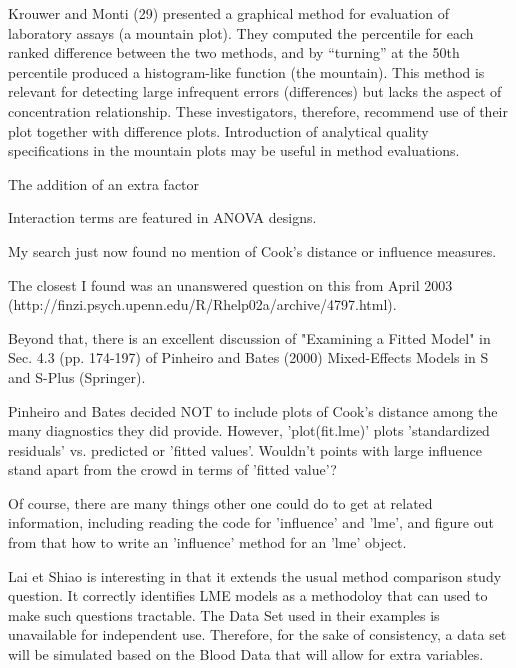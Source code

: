 \documentclass[12pt, a4paper]{report}
\begin{document}


Krouwer and Monti (29) presented a graphical method for evaluation of laboratory assays (a mountain plot). 
They computed the percentile for each ranked difference between the two methods, and by “turning” at the 50th percentile 
produced a histogram-like function (the mountain). 
This method is relevant for detecting large infrequent errors (differences) but lacks the aspect of concentration relationship. 
These investigators, therefore, recommend use of their plot together with difference plots. 
Introduction of analytical quality specifications in the mountain plots may be useful in method evaluations.




The addition of an extra factor

Interaction terms are featured in ANOVA designs.

My search just now found no mention of Cook's distance or influence measures.  

The closest I found was an unanswered question on this from 
April 2003 (http://finzi.psych.upenn.edu/R/Rhelp02a/archive/4797.html).

Beyond that, there is an excellent discussion of "Examining a Fitted Model" in Sec. 4.3 (pp. 174-197) of Pinheiro and Bates (2000) 
Mixed-Effects Models in S and S-Plus (Springer).  

Pinheiro and Bates decided NOT to include plots of Cook's distance among the many diagnostics they did provide.  
However, 'plot(fit.lme)' plots 'standardized residuals' vs. predicted or 'fitted values'.  
Wouldn't points with large influence stand apart from the crowd in terms of 'fitted value'?

Of course, there are many things other one could do to get at related information, including reading the code for 'influence' and 'lme', and 
figure out from that how to write an 'influence' method for an 'lme' object. 



Lai et Shiao is interesting in that it extends the usual method comparison study question. It correctly identifies LME models as a methodoloy that can used to make such questions tractable.
The Data Set used in their examples is unavailable for independent use. Therefore, for the sake of consistency, a data set will be simulated based on the Blood Data that will allow for extra variables.
\end{document}
